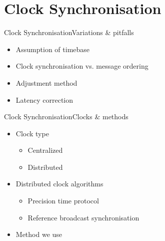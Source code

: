 \documentclass{beamer}
\begin{document}
\section{Clock Synchronisation}
\begin{frame}{Clock Synchronisation}{Variations \& pitfalls}
\begin{center}
\begin{itemize}
  \item \begin{large}Assumption of timebase\end{large}
  \item \begin{large}Clock synchronisation vs. message ordering\end{large}
  \item \begin{large}Adjustment method\end{large}
  \item \begin{large}Latency correction\end{large}
\end{itemize}
\end{center}
\end{frame}


\begin{frame}{Clock Synchronisation}{Clocks \& methods}
  \begin{center}
  \begin{itemize}
    \item \begin{large}Clock type\end{large}
    \begin{itemize}
      \item Centralized
      \item Distributed
    \end{itemize}
    \item \begin{large}Distributed clock algorithms\end{large}
    \begin{itemize}
      \item Precision time protocol
      \item Reference broadcast synchronisation
    \end{itemize}
  \item \begin{large}Method we use\end{large}
  \end{itemize}
  \end{center}
\end{frame}
\end{document}
